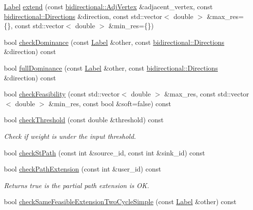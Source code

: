 \begin{DoxyCompactItemize}
\hyperlink{classlabelling_1_1Label}{Label} \hyperlink{classlabelling_1_1Label_a23f7e5da2fb22dca07977aad9bfa9ad3}{extend} (const \hyperlink{structbidirectional_1_1AdjVertex}{bidirectional\+::\+Adj\+Vertex} \&adjacent\+\_\+vertex, const \hyperlink{namespacebidirectional_a4cbe6f0bfbd3629c2cd44c98014aed70}{bidirectional\+::\+Directions} \&direction, const std\+::vector$<$ double $>$ \&max\+\_\+res=\{\}, const std\+::vector$<$ double $>$ \&min\+\_\+res=\{\})
\item 
bool \hyperlink{classlabelling_1_1Label_ad5afbf2f5d2c6f208283021186783883}{check\+Dominance} (const \hyperlink{classlabelling_1_1Label}{Label} \&other, const \hyperlink{namespacebidirectional_a4cbe6f0bfbd3629c2cd44c98014aed70}{bidirectional\+::\+Directions} \&direction) const
\item 
bool \hyperlink{classlabelling_1_1Label_a3f59b4a2818a4b0096080cd5f830b73d}{full\+Dominance} (const \hyperlink{classlabelling_1_1Label}{Label} \&other, const \hyperlink{namespacebidirectional_a4cbe6f0bfbd3629c2cd44c98014aed70}{bidirectional\+::\+Directions} \&direction) const
\item 
bool \hyperlink{classlabelling_1_1Label_adc3068c1147414d77f0f7696b4687e69}{check\+Feasibility} (const std\+::vector$<$ double $>$ \&max\+\_\+res, const std\+::vector$<$ double $>$ \&min\+\_\+res, const bool \&soft=false) const
\item 
bool \hyperlink{classlabelling_1_1Label_a72d0d91c2d99edbcdc36aa157586cf00}{check\+Threshold} (const double \&threshold) const
\begin{DoxyCompactList}\small\item\em Check if weight is under the input threshold. \end{DoxyCompactList}\item 
bool \hyperlink{classlabelling_1_1Label_a0e4957ff69cf08cfdc743df10d50d3c7}{check\+St\+Path} (const int \&source\+\_\+id, const int \&sink\+\_\+id) const
\item 
bool \hyperlink{classlabelling_1_1Label_a496b8a76fd2fe06265b1acc1a508b4ca}{check\+Path\+Extension} (const int \&user\+\_\+id) const
\begin{DoxyCompactList}\small\item\em Returns true is the partial path extension is OK. \end{DoxyCompactList}\item 
bool \hyperlink{classlabelling_1_1Label_a5c8dc87a89577d00ccf86251867ec76a}{check\+Same\+Feasible\+Extension\+Two\+Cycle\+Simple} (const \hyperlink{classlabelling_1_1Label}{Label} \&other) const

\end{DoxyCompactItemize}
